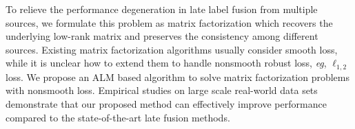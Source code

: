 \documentclass[10pt,twocolumn,letterpaper]{article}
\def\eg{{\emph{e.g.}}}
\def\eg{\emph{eg}}
\begin{document}
To relieve the performance degeneration in late label fusion from multiple sources, we formulate this problem as matrix factorization which recovers the underlying low-rank matrix and preserves the consistency among different sources.
Existing matrix factorization algorithms usually consider smooth loss, while it is unclear how to extend them to handle nonsmooth robust loss, \eg, $\ell_{1,2}$ loss.
We propose an ALM based algorithm to solve matrix factorization problems with nonsmooth loss.
Empirical studies on large scale real-world data sets demonstrate that our proposed method can effectively improve performance compared to the state-of-the-art late fusion methods.

{\small


}
\end{document}

